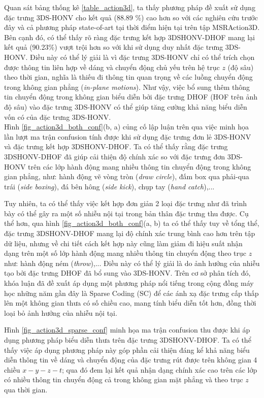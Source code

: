 Quan sát bảng thống kê \ref{table_action3d}, ta thấy phương pháp đề xuất sử dụng đặc trưng 3DS-HONV cho kết quả (88.89 \%) cao hơn so với các nghiên cứu trước đây và cả phương pháp state-of-art tại thời điểm hiện tại\cite{Omar_HON4D} trên tập MSRAction3D. Bên cạnh đó, có thể thấy rõ ràng đặc trưng kết hợp 3DSHONV-DHOF mang lại kết quả (90.23\%) vượt trội hơn so với khi sử dụng duy nhất đặc trưng 3DS-HONV. 
Điều này có thể lý giải là vì đặc trưng 3DS-HONV chỉ có thể trích chọn được thông tin liên hợp về dáng và chuyển động chủ yếu trên hệ trục $z$ (độ sâu) theo thời gian, nghĩa là thiếu đi thông tin quan trọng về các luồng chuyển động trong không gian phẳng (\textit{in-plane motions}). Như vậy, việc bổ sung thêm thông tin chuyển động trong không gian biểu diễn bởi đặc trưng DHOF (HOF trên ảnh độ sâu) vào đặc trưng 3DS-HONV có thể giúp tăng cường khả năng biểu diễn vốn có của đặc trưng 3DS-HONV. \\
Hình \ref{fig_action3d_both_conf}(b, a) củng cố lập luận trên qua việc minh họa lần lượt ma trận confusion tính được khi sử dụng đặc trưng đơn lẻ 3DS-HONV và đặc trưng kết hợp 3DSHONV-DHOF. Ta có thể thấy rằng đặc trưng 3DSHONV-DHOF đã giúp cải thiện độ chính xác so với đặc trưng đơn 3DS-HONV trên các lớp hành động mang nhiều thông tin chuyển động trong không gian phẳng, như: hành động vẽ vòng tròn (\textit{draw circle}), đấm box qua phải-qua trái (\textit{side boxing}), đá bên hông (\textit{side kick}), chụp tay (\textit{hand catch}),... 

Tuy nhiên, ta có thể thấy việc kết hợp đơn giản 2 loại đặc trưng như đã trình bày có thể gây ra một số nhiễu nội tại trong bản thân đặc trưng thu được. Cụ thể hơn, qua hình \ref{fig_action3d_both_conf}(a, b) ta có thể thấy tuy về tổng thể, đặc trưng 3DSHONV-DHOF mang lại độ chính xác trung bình cao hơn trên tập dữ liệu, nhưng về chi tiết cách kết hợp này cũng làm giảm đi hiệu suất nhận dạng trên một số lớp hành động mang nhiều thông tin chuyển động theo trục \(z\) như: hành động ném (\textit{throw}),... Điều này có thể lý giải là do ảnh hưởng của nhiễu tạo bởi đặc trưng DHOF đã bổ sung vào 3DS-HONV. Trên cơ sở phân tích đó, khóa luận đã đề xuất áp dụng một phương pháp nổi tiếng trong cộng đồng máy học những năm gần đây là Sparse Coding (SC) để các ánh xạ đặc trưng cấp thấp lên một không gian thưa có số chiều cao, mang tính biểu diễn tốt hơn, đồng thời loại bỏ ảnh hưởng của nhiễu nội tại. 

Hình \ref{fig_action3d_sparse_conf} minh họa ma trận confusion thu được khi áp dụng phương pháp biểu diễn thưa trên đặc trưng 3DSHONV-DHOF. Ta có thể thấy việc áp dụng phương pháp này góp phần cải thiện đáng kể khả năng biểu diễn thông tin về dáng và chuyển động của đặc trưng rút được trên không gian 4 chiều \(x-y-z-t\); qua đó đem lại kết quả nhận dạng chính xác cao trên các lớp có nhiều thông tin chuyển động cả trong không gian mặt phẳng và theo trục $z$ qua thời gian. 

